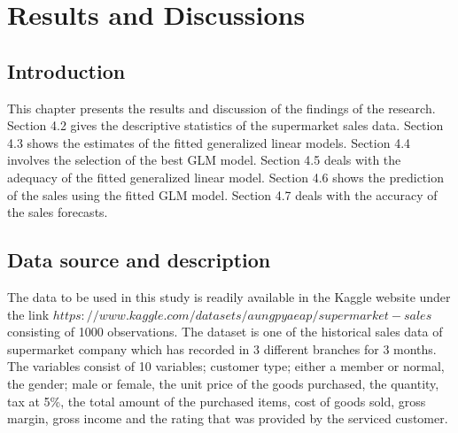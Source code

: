 \chapter{Results and Discussions} 
\label{Chapter4} 
\section{Introduction}
This chapter presents the results and discussion of the findings of the research. Section 4.2 gives
the descriptive statistics of the supermarket sales data. Section 4.3 shows the estimates of the fitted generalized linear models. Section 4.4 involves the selection of the best GLM model. Section 4.5 deals with the adequacy of the fitted generalized linear model. Section 4.6 shows the prediction of the sales using the fitted GLM model. Section 4.7 deals with the accuracy of the sales forecasts.
\section{Data source and description}
The data to be used in this study is readily available in the Kaggle website under the link $https://www.kaggle.com/datasets/aungpyaeap/supermarket-sales$ consisting of 1000 observations. The dataset is one of the historical sales data of supermarket company which has recorded in 3 different branches for 3 months. The variables consist of 10 variables; customer type; either a member or normal, the gender; male or female, the unit price of the goods purchased, the quantity, tax at 5\%, the total amount of the purchased items, cost of goods sold, gross margin, gross income and the rating that was provided by the serviced customer. 

